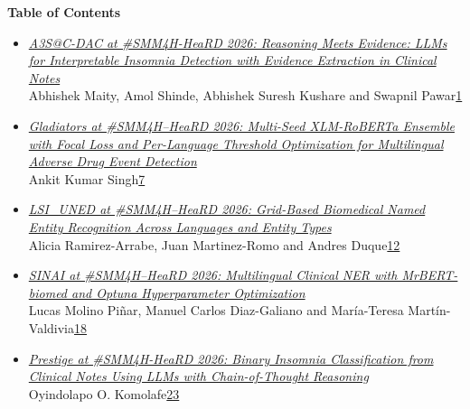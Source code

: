 \documentclass[11pt,oneside]{book}
\begin{document}
{}
\newpage  %
\pagestyle{plain}
\begin{center}
{\Large \textbf{Table of Contents}}
\end{center}
\vspace*{1em}
\newcommand\page[1]{\rightskip=25pt \dotfill\rlap{\hbox to 25pt{\hfill#1}}\par}
\begin{itemize}[leftmargin=*,label={}]
       \item \hyperlink{page.1}{\emph{A3S@C-DAC at \#SMM4H-HeaRD 2026: Reasoning Meets Evidence: LLMs for Interpretable Insomnia Detection with Evidence Extraction in Clinical Notes}}\\ \hspace*{2em} Abhishek Maity, Amol Shinde, Abhishek Suresh Kushare and Swapnil Pawar\dotfill \hyperlink{page.1}{1}
       \item \hyperlink{page.7}{\emph{Gladiators at \#SMM4H–HeaRD 2026: Multi-Seed XLM-RoBERTa Ensemble with Focal Loss and Per-Language Threshold Optimization for Multilingual Adverse Drug Event Detection}}\\ \hspace*{2em} Ankit Kumar Singh\dotfill \hyperlink{page.7}{7}
       \item \hyperlink{page.12}{\emph{LSI\_UNED at \#SMM4H–HeaRD 2026: Grid-Based Biomedical Named Entity Recognition Across Languages and Entity Types}}\\ \hspace*{2em} Alicia Ramirez-Arrabe, Juan Martinez-Romo and Andres Duque\dotfill \hyperlink{page.12}{12}
       \item \hyperlink{page.18}{\emph{SINAI at \#SMM4H–HeaRD 2026: Multilingual Clinical NER with MrBERT-biomed and Optuna Hyperparameter Optimization}}\\ \hspace*{2em} Lucas Molino Piñar, Manuel Carlos Diaz-Galiano and María-Teresa Martín-Valdivia\dotfill \hyperlink{page.18}{18}
       \item \hyperlink{page.23}{\emph{Prestige at \#SMM4H-HeaRD 2026: Binary Insomnia Classification from Clinical Notes Using LLMs with Chain-of-Thought Reasoning}}\\ \hspace*{2em} Oyindolapo O. Komolafe\dotfill \hyperlink{page.23}{23}

\end{itemize}
\end{document}
